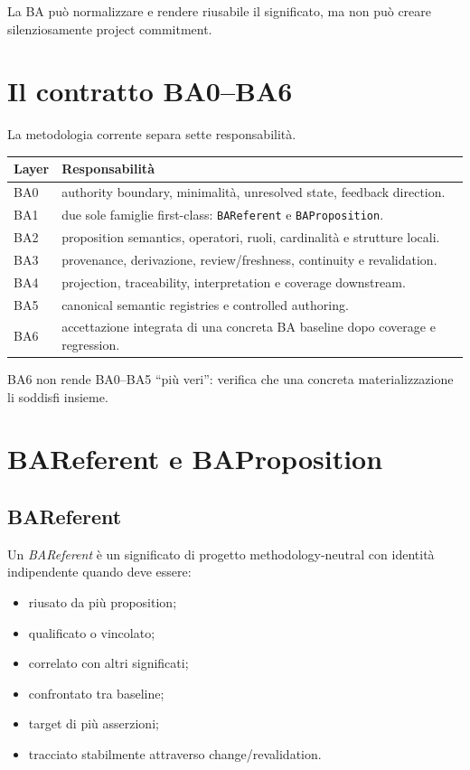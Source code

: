 \documentclass[11pt,a4paper]{article}
\newcommand{\code}[1]{\nolinkurl{#1}}
\newcommand{\BAR}{\textit{BAReferent}}
\begin{document}
La BA può normalizzare e rendere riusabile il significato, ma non può creare silenziosamente project commitment.

\section{Il contratto BA0--BA6}

La metodologia corrente separa sette responsabilità.

\begin{longtable}{L{0.13\textwidth}L{0.75\textwidth}}
\toprule
\textbf{Layer} & \textbf{Responsabilità} \\
\midrule\endhead
BA0 & authority boundary, minimalità, unresolved state, feedback direction. \\
BA1 & due sole famiglie first-class: \code{BAReferent} e \code{BAProposition}. \\
BA2 & proposition semantics, operatori, ruoli, cardinalità e strutture locali. \\
BA3 & provenance, derivazione, review/freshness, continuity e revalidation. \\
BA4 & projection, traceability, interpretation e coverage downstream. \\
BA5 & canonical semantic registries e controlled authoring. \\
BA6 & accettazione integrata di una concreta BA baseline dopo coverage e regression. \\
\bottomrule
\end{longtable}

BA6 non rende BA0--BA5 ``più veri'': verifica che una concreta materializzazione li soddisfi insieme.

\section{BAReferent e BAProposition}

\subsection{BAReferent}

Un \BAR{} è un significato di progetto methodology-neutral con identità indipendente quando deve essere:

\begin{itemize}
\item riusato da più proposition;
\item qualificato o vincolato;
\item correlato con altri significati;
\item confrontato tra baseline;
\item target di più asserzioni;
\item tracciato stabilmente attraverso change/revalidation.
\end{itemize}
\end{document}
